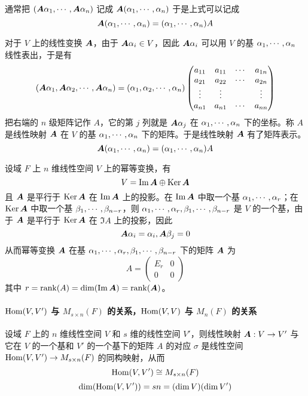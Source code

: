 通常把 $(\boldsymbol{A} \alpha_1,\cdots,\boldsymbol{A} \alpha_n)$ 记成 $\boldsymbol{A}(\alpha_1,\cdots,\alpha_n)$ 于是上式可以记成
\[ \boldsymbol{A}(\alpha_1,\cdots,\alpha_n) = (\alpha_1,\cdots,\alpha_n) A\]

对于 $V$ 上的线性变换 $\boldsymbol{A}$，由于 $\boldsymbol{A} \alpha_i \in V$，因此 $\boldsymbol{A} \alpha_i$ 可以用 $V$ 的基 $\alpha_1,\cdots,\alpha_n$ 线性表出，于是有
\[ 
    \left( \boldsymbol{A} \alpha_1 , \boldsymbol{A} \alpha_2 , \cdots , \boldsymbol{A} \alpha_n \right) = 
    \left( \alpha_1 , \alpha_2 , \cdots , \alpha_n \right)
    \left( \begin{matrix}
            a_{11} & a_{11} & \cdots & a_{1n} \\
            a_{21} & a_{22} & \cdots & a_{2n} \\
            \vdots & \vdots &        & \vdots \\
            a_{n1} & a_{n1} & \cdots & a_{nn}
        \end{matrix} \right)
\]
把右端的 $n$ 级矩阵记作 $A$，它的第 $j$ 列就是 $\boldsymbol{A} \alpha_j$ 在 $\alpha_1,\cdots,\alpha_n$ 下的坐标。称 $A$ 是线性映射 $\boldsymbol{A}$ 在 $V$ 的基 $\alpha_1,\cdots,\alpha_n$ 下的矩阵。于是线性映射 $\boldsymbol{A}$ 有了矩阵表示。
\[ \boldsymbol{A}(\alpha_1,\cdots,\alpha_n) = (\alpha_1,\cdots,\alpha_n) A\]

设域 $F$ 上 $n$ 维线性空间 $V$ 上的幂等变换，有
\[ V = \operatorname{Im} \boldsymbol{A} \oplus \operatorname{Ker} \boldsymbol{A} \]
且 $\boldsymbol{A}$ 是平行于 $\operatorname{Ker} \boldsymbol{A}$ 在 $\operatorname{Im} \boldsymbol{A}$ 上的投影。在 $\operatorname{Im} \boldsymbol{A}$ 中取一个基 $\alpha_1,\cdots,\alpha_r$；在 $\operatorname{Ker} \boldsymbol{A}$ 中取一个基 $\beta_1,\cdots,\beta_{n-r}$，则 $\alpha_1,\cdots,\alpha_r,\beta_1,\cdots,\beta_{n-r}$ 是 $V$ 的一个基，由于 $\boldsymbol{A}$ 是平行于 $\operatorname{Ker} \boldsymbol{A}$ 在 $\Im A$ 上的投影，因此
\[ \boldsymbol{A} \alpha_i = \alpha_i, \boldsymbol{A} \beta_j = 0 \]
从而幂等变换 $\boldsymbol{A}$ 在基 $\alpha_1,\cdots,\alpha_r,\beta_1,\cdots,\beta_{n-r}$ 下的矩阵 $\boldsymbol{A}$ 为
\[ A = \left(\begin{matrix}
            E_r & 0  \\
            0   & 0
        \end{matrix}\right) \]
其中 $r = \operatorname{rank}(A) = \dim(\operatorname{Im} \boldsymbol{A}) = \operatorname{rank}(\boldsymbol{A})$。

\paragraph{$\operatorname{Hom}(V,V')$ 与 $M_{s \times n}(F)$ 的关系，$\operatorname{Hom}(V,V)$ 与 $M_n(F)$ 的关系}

\begin{theorem}
    设域 $F$ 上的 $n$ 维线性空间 $V$ 和 $s$ 维的线性空间 $V'$，则线性映射 $\boldsymbol{A} : V \to V'$ 与它在 $V$ 的一个基和 $V'$ 的一个基下的矩阵 $A$ 的对应 $\sigma$ 是线性空间 $\operatorname{Hom}(V,V') \to M_{s \times n}(F)$ 的同构映射，从而
    \[ \operatorname{Hom}(V,V') \cong M_{s \times n}(F) \]
    \[ \dim(\operatorname{Hom}(V,V')) = sn = (\dim V)(\dim V') \]
\end{theorem}


